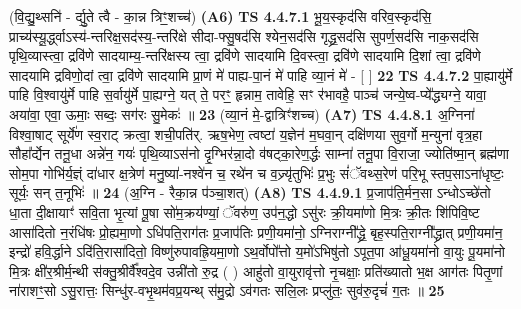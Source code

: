 \documentclass[17pt]{extarticle}
\begin{document}
                  \newline
                      (वि॒द्यु॒थ्सनि॑ - र्द्यु॒ते त्वै - का॒न्न त्रिꣳ॒॒शच्च॑)  \textbf{(A6)} \newline \newline
                                        \textbf{ TS 4.4.7.1} \newline
                  भू॒य॒स्कृद॑सि वरिव॒स्कृद॑सि॒ प्राच्य॑स्यू॒र्द्ध्वाऽस्य॑-न्तरिक्ष॒सद॑स्य॒-न्तरि॑क्षे सीदा-फ्सु॒षद॑सि श्येन॒सद॑सि गृद्ध्र॒सद॑सि सुपर्ण॒सद॑सि नाक॒सद॑सि पृथि॒व्यास्त्वा॒ द्रवि॑णे सादयाम्य॒-न्तरि॑क्षस्य त्वा॒ द्रवि॑णे सादयामि दि॒वस्त्वा॒ द्रवि॑णे सादयामि दि॒शां त्वा॒ द्रवि॑णे सादयामि द्रविणो॒दां त्वा॒ द्रवि॑णे सादयामि प्रा॒णं मे॑ पाह्य-पा॒नं मे॑ पाहि व्या॒नं मे॑ - [  ] \textbf{  22} \newline
                  \newline
                                \textbf{ TS 4.4.7.2} \newline
                  पा॒ह्यायु॑र्मे पाहि वि॒श्वायु॑र्मे पाहि स॒र्वायु॑र्मे पा॒ह्यग्ने॒ यत् ते॒ परꣳ॒॒ हृन्नाम॒ तावेहि॒ सꣳ र॑भावहै॒ पाञ्च॑ जन्ये॒ष्व-प्ये᳚द्ध्यग्ने॒ यावा॒ अया॑वा॒ एवा॒ ऊमाः॒ सब्दः॒ सग॑रः सु॒मेकः॑ ॥ \textbf{  23 } \newline
                  \newline
                      (व्या॒नं मे॒-द्वात्रिꣳ॑शच्च)  \textbf{(A7)} \newline \newline
                                        \textbf{ TS 4.4.8.1} \newline
                  अ॒ग्निना॑ विश्वा॒षाट् सूर्ये॑ण स्व॒राट् क्रत्वा॒ शची॒पति॑र्. ऋष॒भेण॒ त्वष्टा॑ य॒ज्ञेन॑ म॒घवा॒न् दक्षि॑णया सुव॒र्गो म॒न्युना॑ वृत्र॒हा सौहा᳚र्द्येन तनू॒धा अन्ने॑न॒ गयः॑ पृथि॒व्याऽस॑नो दृ॒ग्भिर॑न्ना॒दो व॑षट्का॒रेण॒र्द्धः साम्ना॑ तनू॒पा वि॒राजा॒ ज्योति॑ष्मा॒न् ब्रह्म॑णा सोम॒पा गोभि॑र्य॒ज्ञ्ं दा॑धार क्ष॒त्रेण॑ मनु॒ष्या॑-नश्वे॑न च॒ रथे॑न च व॒ज्र्यृ॑तुभिः॑ प्र॒भुः सं॑ॅवथ्स॒रेण॑ परि॒भू स्तप॒साऽना॑धृष्टः॒ सूर्यः॒ सन् त॒नूभिः॑ ॥ \textbf{  24} \newline
                  \newline
                      (अ॒ग्नि - रैका॒न्न प॑ञ्चा॒शत्)  \textbf{(A8)} \newline \newline
                                        \textbf{ TS 4.4.9.1} \newline
                  प्र॒जाप॑ति॒र्मन॒सा ऽन्धोऽच्छे॑तो धा॒ता दी॒क्षायाꣳ॑ सवि॒ता भृ॒त्यां पू॒षा सो॑म॒क्रय॑ण्यां॒ ॅवरु॑ण॒ उप॑न॒द्धो ऽसु॑रः क्री॒यमा॑णो मि॒त्रः क्री॒तः शि॑पिवि॒ष्ट आसा॑दितो न॒रंधि॑षः प्रो॒ह्यमा॒णो ऽधि॑पति॒राग॑तः प्र॒जाप॑तिः प्रणी॒यमा॑नो॒ ऽग्निराग्नी᳚द्ध्रे॒ बृह॒स्पति॒राग्नी᳚द्ध्रात् प्रणी॒यमा॑न॒ इन्द्रो॑ हवि॒र्द्धाने ऽदि॑ति॒रासा॑दितो॒ विष्णु॑रुपावह्रि॒यमा॒णो ऽथ॒र्वोपो᳚त्तो य॒मो॑ऽभिषु॑तो ऽपूत॒पा आ॑धू॒यमा॑नो वा॒युः पू॒यमा॑नो मि॒त्रः क्षी॑र॒श्रीर्म॒न्थी स॑क्तु॒श्रीर्वै᳚श्वदे॒व उन्नी॑तो रु॒द्र ( ) आहु॑तो वा॒युरावृ॑त्तो नृ॒चक्षाः॒ प्रति॑ख्यातो भ॒क्ष आग॑तः पितृ॒णां ना॑राशꣳ॒॒सो ऽसु॒रात्तः॒ सिन्धु॑र-वभृ॒थम॑वप्र॒यन्थ् स॑मु॒द्रो ऽव॑गतः सलि॒लः प्रप्लु॑तः॒ सुव॑रु॒दृचं॑ ग॒तः ॥ \textbf{  25 } \newline
\end{document}
